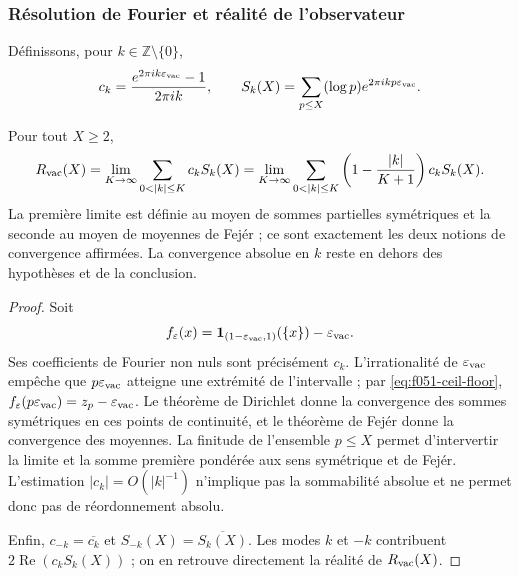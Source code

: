 \subsubsection{Résolution de Fourier et réalité de l’observateur}

Définissons, pour \(k\in\mathbb Z\setminus\{0\}\),
\begin{equation}
 c_k=\frac{e^{2\pi i k\varepsilon_{\rm vac}}-1}{2\pi i k},
 \qquad
 S_k(X)=\sum_{p\leq X}(\log p)
             e^{2\pi i k p\varepsilon_{\rm vac}}.
 \label{eq:f051-fourier-data}
\end{equation}

\begin{proposition}
\label{prop:f051-fourier-resolution}
Pour tout \(X\geq2\),
\begin{equation}
 R_{\rm vac}(X)
 =\lim_{K\to\infty}
   \sum_{0<|k|\leq K}c_kS_k(X)
 =\lim_{K\to\infty}
   \sum_{0<|k|\leq K}
   \left(1-\frac{|k|}{K+1}\right)c_kS_k(X).
 \label{eq:f051-fourier-pair}
\end{equation}
La première limite est définie au moyen de sommes partielles symétriques et la
seconde au moyen de moyennes de Fejér ; ce sont exactement les deux notions
de convergence affirmées. La convergence absolue en \(k\) reste en dehors
des hypothèses et de la conclusion.
\end{proposition}

\begin{proof}
Soit
\[
 f_{\varepsilon}(x)
 =\mathbf1_{(1-\varepsilon_{\rm vac},1)}(\{x\})
  -\varepsilon_{\rm vac}.
\]
Ses coefficients de Fourier non nuls sont précisément \(c_k\).
L’irrationalité de \(\varepsilon_{\rm vac}\) empêche que
\(p\varepsilon_{\rm vac}\) atteigne une extrémité de l’intervalle ; par
\eqref{eq:f051-ceil-floor},
\(f_{\varepsilon}(p\varepsilon_{\rm vac})
 =z_p-\varepsilon_{\rm vac}\). Le théorème de Dirichlet donne la convergence
des sommes symétriques en ces points de continuité, et le théorème de
Fejér donne la convergence des moyennes. La finitude de l’ensemble
\(p\leq X\) permet d’intervertir la limite et la somme première pondérée aux
sens symétrique et de Fejér. L’estimation
\(|c_k|=O(|k|^{-1})\) n’implique pas la sommabilité absolue et ne
permet donc pas de réordonnement absolu.

Enfin,
\(c_{-k}=\overline{c_k}\) et
\(S_{-k}(X)=\overline{S_k(X)}\). Les modes \(k\) et \(-k\) contribuent
\(2\operatorname{Re}(c_kS_k(X))\) ; on en retrouve directement la
réalité de \(R_{\rm vac}(X)\).
\end{proof}

